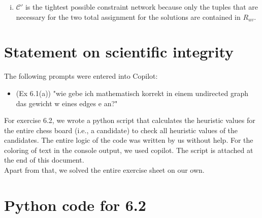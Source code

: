 \documentclass{article} %
\begin{document}
\begin{enumerate}[(a)]
\begin{enumerate}[(i)]
        \begin{itemize}
            \item $\alpha_1 = \{
                a \mapsto 0,
                b \mapsto 0,
                c \mapsto 3
            \}$
            \item $\alpha_2 = \{
                a \mapsto 1,
                b \mapsto 1,
                c \mapsto 2
            \}$
        \end{itemize}
        \item $\mathcal{C}'$ is the tightest possible constraint network
        because only the tuples that are necessary for the two
        total assignment for the solutions are contained in $R_{uv}$.
    \end{enumerate}
\end{enumerate}

\newpage
\section*{Statement on scientific integrity}
The following prompts were entered into Copilot:
\begin{itemize}
    \item (Ex 6.1(a)) "wie gebe ich mathematisch korrekt in einem undirected graph das gewicht w eines edges e an?"
\end{itemize}
For exercise 6.2, we wrote a python script that calculates
the heuristic values for the entire chess board (i.e., a candidate)
to check all heuristic values of the candidates. The entire logic of the
code was written by us without help. For the coloring of text in the console
output, we used copilot.
The script is attached at the end of this document.\\[0.5em]
Apart from that, we solved the entire exercise sheet on our own.

\newpage
\section*{Python code for 6.2}
\lstset{
    basicstyle=\ttfamily\footnotesize,
}

\end{document}
